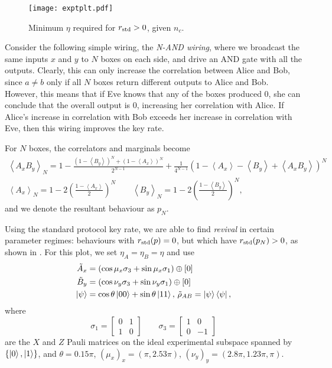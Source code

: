 \documentclass[10pt, a4paper]{article}
\numberwithin{equation}{section} %
\theoremstyle{definition}
\theoremstyle{plain}
\newcommand{\?}{\mathrel{?}} %
\newcommand{\angleb}[1]{\left\langle #1 \right\rangle} %
\newcommand{\std}{\rm std}
\begin{document}
    \begin{figure}
      \centering
      \texttt{[image: exptplt.pdf]}
      \caption{\label{fig:exptplt} Minimum \(\eta\) required for \(r_{\std} > 0\), given \(n_c\).}
    \end{figure}

      Consider the following simple wiring, the \emph{N-AND wiring}, where we broadcast the same inputs \(x\) and \(y\) to \(N\) boxes on each side, and drive an AND gate with all the outputs. Clearly, this can only increase the correlation between Alice and Bob, since \(a \neq b\) only if all \(N\) boxes return different outputs to Alice and Bob. However, this means that if Eve knows that any of the boxes produced 0, she can conclude that the overall output is 0, increasing her correlation with Alice. If Alice's increase in correlation with Bob exceeds her increase in correlation with Eve, then this wiring improves the key rate.

      For \(N\) boxes, the correlators and marginals become
      \begin{gather}
        \angleb{A_x B_y}_{N} = 1 - \frac{{(1-\angleb{B_y})}^N + {(1-\angleb{A_x})}^N}{2^{N-1}} + \frac{1}{4^{N-1}} {(1-\angleb{A_x} - \angleb{B_y} + \angleb{A_x B_y})}^{N} \\
        \angleb{A_x}_{N} = 1 - 2 {\left(\frac{1-\angleb{A_x}}{2}\right)}^N \qquad \angleb{B_y}_{N} = 1 - 2 {\left(\frac{1-\angleb{B_y}}{2}\right)}^N,
      \end{gather}
      and we denote the resultant behaviour as \(p_N\).

      Using the standard protocol key rate, we are able to find \emph{revival} in certain parameter regimes: behaviours with \(r_{\std}(p) = 0\), but which have \(r_{\std}(p_N) > 0\), as shown in . For this plot, we set \(\eta_A = \eta_B = \eta\) and use
      \begin{align*}
        \tilde{A}_x &= \left(\cos\mu_x \sigma_3 + \sin\mu_x \sigma_1\right) \oplus [0] \\
        \tilde{B}_y &= \left(\cos\nu_y \sigma_3 + \sin\nu_y \sigma_1\right) \oplus [0] \\
        \ket{\psi} &= \cos\theta \ket{00} + \sin\theta \ket{11},\,\tilde{\rho}_{AB} = \ket{\psi}\bra{\psi},
      \end{align*}
      where
      \[ \sigma_1 = \begin{bmatrix} 0 & 1 \\ 1 &  0 \end{bmatrix} \qquad \sigma_3 = \begin{bmatrix} 1 & 0 \\ 0 & -1 \end{bmatrix} \]
      are the \(X\) and \(Z\) Pauli matrices on the ideal experimental subspace spanned by \(\{\ket{0}, \ket{1}\}\), and \(\theta=0.15\pi\), \({(\mu_x)}_x = (\pi, 2.53\pi)\), \({(\nu_y)}_y = (2.8\pi, 1.23\pi, \pi)\).
\end{document}

